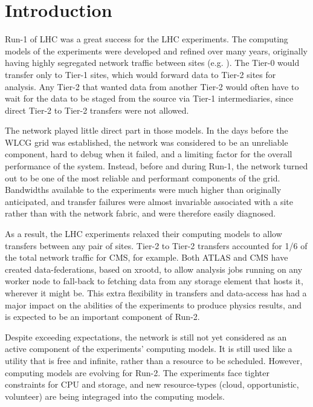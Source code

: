 \section{Introduction}

Run-1 of LHC was a great success for the LHC experiments. The computing models of the experiments were developed and refined over many years, originally having highly segregated network traffic between sites (e.g. \cite{CMSCompModel}). The Tier-0 would transfer only to Tier-1 sites, which would forward data to Tier-2 sites for analysis. Any Tier-2 that wanted data from another Tier-2 would often have to wait for the data to be staged from the source via Tier-1 intermediaries, since direct Tier-2 to Tier-2 transfers were not allowed.

The network played little direct part in those models. In the days before the WLCG grid\cite{WLCG} was established, the network was considered to be an unreliable component, hard to debug when it failed, and a limiting factor for the overall performance of the system. Instead, before and during Run-1, the network turned out to be one of the most reliable and performant components of the grid. Bandwidths available to the experiments were much higher than originally anticipated, and transfer failures were almost invariable associated with a site rather than with the network fabric, and were therefore easily diagnosed.

As a result, the LHC experiments relaxed their computing models to allow transfers between any pair of sites. Tier-2 to Tier-2 transfers accounted for 1/6 of the total network traffic for CMS, for example. Both ATLAS and CMS have created data-federations, based on xrootd\cite{xrootd}, to allow analysis jobs running on any worker node to fall-back to fetching data from any storage element that hosts it, wherever it might be. This extra flexibility in transfers and data-access has had a major impact on the abilities of the experiments to produce physics results, and is expected to be an important component of Run-2.

Despite exceeding expectations, the network is still not yet considered as an active component of the experiments' computing models. It is still used like a utility that is free and infinite, rather than a resource to be scheduled. However, computing models are evolving for Run-2. The experiments face tighter constraints for CPU and storage, and new resource-types (cloud, opportunistic, volunteer) are being integraged into the computing models.

